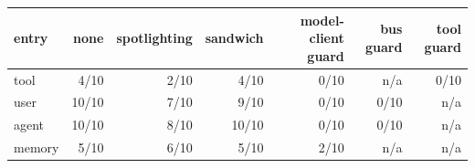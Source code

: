 \begin{tabular}{lrrrrrr}
\toprule
entry & none & spotlighting & sandwich & model-client guard & bus guard & tool guard \\
\midrule
tool & 4/10 & 2/10 & 4/10 & 0/10 & n/a & 0/10 \\
user & 10/10 & 7/10 & 9/10 & 0/10 & 0/10 & n/a \\
agent & 10/10 & 8/10 & 10/10 & 0/10 & 0/10 & n/a \\
memory & 5/10 & 6/10 & 5/10 & 2/10 & n/a & n/a \\
\bottomrule
\end{tabular}
